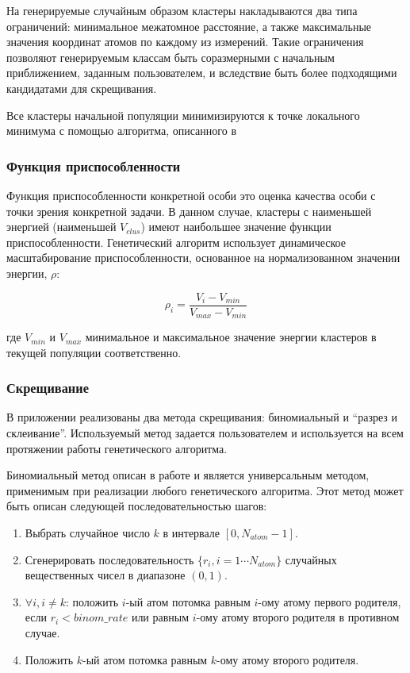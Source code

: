 На генерируемые случайным образом кластеры накладываются два типа ограничений:
минимальное межатомное расстояние, а также максимальные значения координат атомов
по каждому из измерений. Такие ограничения позволяют генерируемым классам быть соразмерными
с начальным приближением, заданным пользователем, и вследствие быть более подходящими
кандидатами для скрещивания.

Все кластеры начальной популяции минимизируются к точке локального минимума с помощью алгоритма,
описанного в %

\subsubsection {Функция приспособленности}

Функция приспособленности конкретной особи это оценка качества особи с точки зрения
конкретной задачи. В данном случае, кластеры с наименьшей энергией (наименьшей $V_{clus}$)
имеют наибольшее значение функции приспособленности. Генетический алгоритм использует
динамическое масштабирование приспособленности, основанное на нормализованном значении
энергии, $\rho$:

\begin{equation}
  \rho_{i} = \frac{V_{i} - V_{min}}{V_{max}-V_{min}}
\end{equation}

где $V_{min}$ и $V_{max}$ минимальное и максимальное значение энергии кластеров в
текущей популяции соответственно.

\subsubsection {Скрещивание}

В приложении реализованы два метода скрещивания: биномиальный и ``разрез и склеивание''.
Используемый метод задается пользователем и используется на всем протяжении работы
генетического алгоритма.

Биномиальный метод описан в работе \cite{Zaharie2007} и является универсальным методом,
применимым при реализации любого генетического алгоритма. Этот метод может быть описан
следующей последовательностью шагов:

\begin{enumerate}
  \item{Выбрать случайное число $k$ в интервале $[0, N_{atom} - 1]$.}
  \item{Сгенерировать последовательность $\lbrace r_{i}, i=1 \cdots N_{atom} \rbrace$
    случайных вещественных чисел в диапазоне $(0,1)$.}
  \item{$\forall i, i \neq k$: положить $i$-ый атом потомка равным $i$-ому атому первого
      родителя, если $r_{i} < binom\_rate$ или равным $i$-ому атому второго родителя
    в противном случае.}
  \item{Положить $k$-ый атом потомка равным $k$-ому атому второго родителя.}
\end{enumerate}

